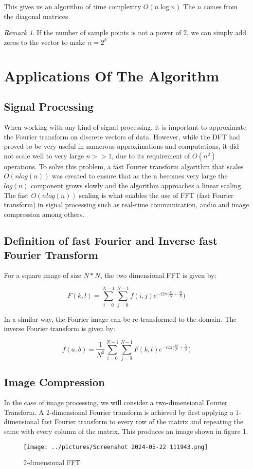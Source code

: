 \documentclass[11pt]{amsart}
\theoremstyle{definition}
\theoremstyle{remark}
\newtheorem{rem}[thm]{Remark}
\numberwithin{equation}{section}
\begin{document}
This gives us an algorithm of time complexity $O(n \log{n})$ The $n$ comes from the diagonal matrices 

\begin{rem}
	If the number of sample points is not a power of 2, we can simply add zeros to the vector to make $n = 2^{k}$
\end{rem}

\section{Applications Of The Algorithm}
\subsection{Signal Processing}
When working with any kind of signal processing, it is important to approximate the Fourier transform on discrete vectors of data. However, while the DFT had proved to be very useful in numerous approximations and computations, it did not scale well to very large $n>>1$, due to its requirement of $O(n^2)$ operations. To solve this problem, a fast Fourier transform algorithm that scales $O(nlog(n))$ was created to ensure that as the n becomes very large the $log(n)$ component grows slowly and the algorithm approaches a linear scaling. The fast $O(nlog(n))$ scaling is what enables the use of FFT (fast Fourier transform) in signal processing such as real-time communication, audio and image compression among others.
\subsection {Definition of fast Fourier and Inverse fast Fourier Transform}

For a square image of size $N*N$, the two dimensional FFT is given by:


\[
F(k,l) = \sum_{i=0}^{N-1} \sum_{j =0}^{N-1} f(i,j) e^{-i2\pi(\frac{ki}{N} +\frac{lg}{N}})
\]

In a similar way, the Fourier image can be re-transformed to the domain. The inverse Fourier transform is given by:

\[
	f(a,b) = \frac{1}{N^{2}} \sum_{i=0}^{N-1} \sum_{j =0}^{N-1} F(k,l) e^{-i2\pi(\frac{ki}{N} +\frac{lg}{N}})
\]

\subsection {Image Compression}
In the case of image processing, we will consider a two-dimensional Fourier Transform. A 2-dimensional Fourier transform is achieved by first applying a 1-dimensional fast Fourier transform to every row of the matrix and repeating the same with every column of the matrix. This produces an image shown in figure 1.
\begin{figure} [h]
    \centering
    \texttt{[image: ../pictures/Screenshot 2024-05-22 111943.png]}
    \caption{2-dimensional FFT}
    \label{fig:1.1}
\end{figure}
\end{document}
